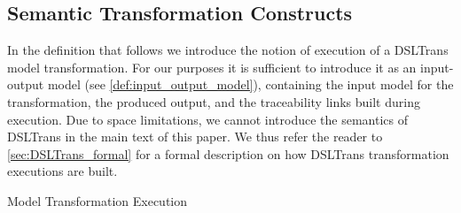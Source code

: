 % 
% 
% 

\subsection{Semantic Transformation Constructs}
\label{sec:DSLTrans_semantics}

In the definition that follows we introduce the notion of execution of a DSLTrans model transformation. For our purposes it is sufficient to introduce it as an input-output model (see \cref{def:input_output_model}), containing the input model for the transformation, the produced output, and the traceability links built during execution. Due to space limitations, we cannot introduce the semantics of DSLTrans in the main text of this paper. We thus refer the reader to \cref{sec:DSLTrans_formal} for a formal description on how DSLTrans transformation executions are built. 

\begin{definition} {Model Transformation Execution\\}
\label{def:modeltransformation} 
\end{definition}

